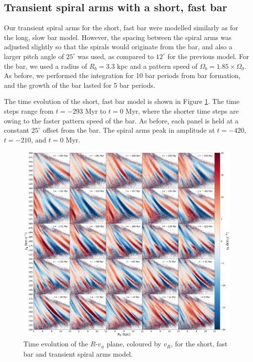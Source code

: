\documentclass[10pt]{article}
\begin{document}
\subsection{Transient spiral arms with a short, fast bar}
Our transient spiral arms for the short, fast bar were modelled similarly as for the long, slow bar model. However, the spacing between the spiral arms was adjusted slightly so that the spirals would originate from the bar, and also a larger pitch angle of $25^\circ$ was used, as compared to $12^\circ$ for the previous model. For the bar, we used a radius of $R_b = 3.3$ kpc and a pattern speed of $\Omega_b = 1.85 \times \Omega_0$. As before, we performed the integration for 10 bar periods from bar formation, and the growth of the bar lasted for 5 bar periods. 

The time evolution of the short, fast bar model is shown in Figure \ref{fig:sfb}. The time steps range from $t = -293$ Myr to $t = 0$ Myr, where the shorter time steps are owing to the faster pattern speed of the bar. As before, each panel is held at a constant $25^\circ$ offset from the bar. The spiral arms peak in amplitude at $t = -420$, $t = -210$, and $t = 0$ Myr.

\begin{figure}[h]
    \centering
    \includegraphics[width=\textwidth]{plots/sfb_spiral_RvT_vR.pdf}
    \caption{Time evolution of the $R$-$v_\phi$ plane, coloured by $v_R$, for the short, fast bar and transient spiral arms model.}
    \label{fig:sfb}
\end{figure}
\end{document}
